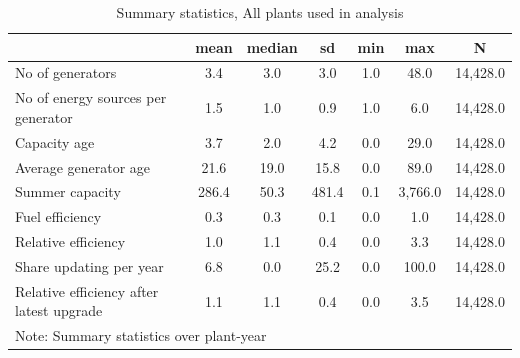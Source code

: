 \begin{table}[htbp]\centering
\scriptsize
\def\sym#1{\ifmmode^{#1}\else\(^{#1}\)\fi}
\caption{Summary statistics, All plants used in analysis}
\begin{tabular}{l*{1}{cccccc}}
\hline\hline
                    &        mean&      median&          sd&         min&         max&           N\\
\hline
No of generators    &         3.4&         3.0&         3.0&         1.0&        48.0&    14,428.0\\
No of energy sources per generator&         1.5&         1.0&         0.9&         1.0&         6.0&    14,428.0\\
Capacity age        &         3.7&         2.0&         4.2&         0.0&        29.0&    14,428.0\\
Average generator age&        21.6&        19.0&        15.8&         0.0&        89.0&    14,428.0\\
Summer capacity     &       286.4&        50.3&       481.4&         0.1&     3,766.0&    14,428.0\\
Fuel efficiency     &         0.3&         0.3&         0.1&         0.0&         1.0&    14,428.0\\
Relative efficiency &         1.0&         1.1&         0.4&         0.0&         3.3&    14,428.0\\
Share updating per year&         6.8&         0.0&        25.2&         0.0&       100.0&    14,428.0\\
Relative efficiency after latest upgrade&         1.1&         1.1&         0.4&         0.0&         3.5&    14,428.0\\
\hline\hline
\multicolumn{7}{l}{\footnotesize Note: Summary statistics over plant-year}\\
\end{tabular}
\end{table}
